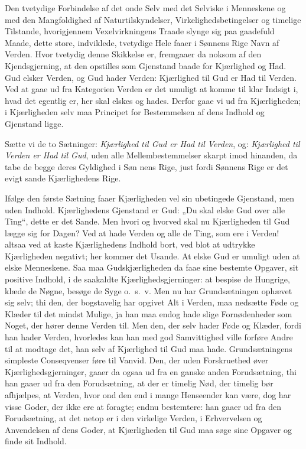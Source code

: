 \documentclass[12pt]{book}
\begin{document}
Den tvetydige Forbindelse af det onde Selv med det Selviske i
Menneskene og med den Mangfoldighed af Naturtilskyndelser,
Virkelighedsbetingelser og timelige Tilstande, hvorigjennem
Vexelvirkningens Traade slynge sig paa gaadefuld Maade, dette store,
indviklede, tvetydige Hele faaer i Sønnens Rige Navn af Verden. Hvor
tvetydig denne Skikkelse er, fremgaaer da noksom af den
Kjendsgjerning, at den opstilles som Gjenstand baade for Kjærlighed
og Had. Gud elsker Verden, og Gud hader Verden: Kjærlighed til Gud
er Had til Verden. Ved at gaae ud fra Kategorien Verden er det
umuligt at komme til klar Indsigt i, hvad det egentlig er, her skal
elskes og hades. Derfor gaae vi ud fra Kjærligheden; i
Kjærligheden selv maa Principet for Bestemmelsen af dens Indhold og
Gjenstand ligge.

Sætte vi de to Sætninger: \emph{Kjærlighed til Gud er Had til
Verden}, og: \emph{Kjærlighed til Verden er Had til Gud}, uden alle
Mellembestemmelser skarpt imod hinanden, da tabe de begge deres
Gyldighed i Søn\-
nens Rige, just fordi Sønnens Rige er det evigt sande Kjærlighedens
Rige.

Ifølge den første Sætning faaer Kjærligheden vel sin ubetingede
Gjenstand, men uden Indhold. Kjærlighedens Gjenstand er Gud: „Du
skal elske Gud over alle Ting“, dette er det Sande. Men hvori og
hvorved skal nu Kjærligheden til Gud lægge sig for Dagen? Ved at
hade Verden og alle de Ting, som ere i Verden! altsaa ved at kaste
Kjærlighedens Indhold bort, ved blot at udtrykke Kjærligheden
negativt; her kommer det Usande. At elske Gud er umuligt uden at
elske Menneskene. Saa maa Gudskjærligheden da faae sine bestemte
Opgaver, sit positive Indhold, i de saakaldte Kjærlighedsgjerninger:
at bespise de Hungrige, klæde de Nøgne, besøge de Syge o.\ s.\ v.
Men nu har Grundsætningen ophævet sig selv; thi den, der bogstavelig
har opgivet Alt i Verden, maa nedsætte Føde og Klæder til det mindst
Mulige, ja han maa endog hade slige Fornødenheder som Noget, der
hører denne Verden til. Men den, der selv hader Føde og Klæder,
fordi han hader Verden, hvorledes kan han med god Samvittighed ville
forføre Andre til at modtage det, han selv af Kjærlighed til Gud maa
hade. Grundsætningens simpleste Conseqvenser føre til Vanvid. Den,
der uden Forskruethed øver Kjærlighedsgjerninger, gaaer da ogsaa ud
fra en ganske anden Forudsætning, thi han gaaer ud fra den
Forudsætning, at der er timelig Nød, der timelig bør afhjælpes, at
Verden, hvor ond den end i mange Henseender kan være, dog har visse
Goder, der ikke ere at foragte; endnu bestemtere: han gaaer ud fra
den Forudsætning, at det netop er i den virkelige Verden, i
Erhvervelsen og Anvendelsen af dens Goder, at Kjærligheden til Gud
maa søge sine Opgaver og finde sit Indhold.
\end{document}
